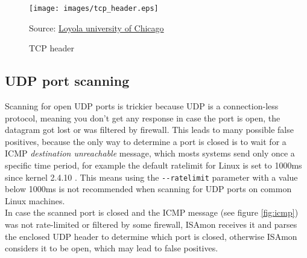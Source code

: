\documentclass[11pt,a4paper]{article}
\newcommand{\source}[1]{\caption*{Source: {#1}} }
\begin{document}
		\begin{figure}[h]
			\centering
			\texttt{[image: images/tcp\_header.eps]}
			\caption{TCP header}
			\label{fig:tcp_header}
			\source{\href{http://intronetworks.cs.luc.edu/1/html/tcp.html}{Loyola university of Chicago}}
		\end{figure}


	\subsection{UDP port scanning}
		Scanning for open UDP ports is trickier because UDP is a connection-less protocol, meaning you don't get any response in case the port is open, the datagram got lost or was filtered by firewall. This leads to many possible false positives, because the only way to determine a port is closed is to wait for a ICMP \emph{destination unreachable} message, which mosts systems send only once a specific time period, for example the default ratelimit for Linux is set to 1000ms since kernel 2.4.10 \cite{man7:icmp}. This means using the \texttt{-{}-ratelimit} parameter with a value below 1000ms is not recommended when scanning for UDP ports on common Linux machines.\\
		In case the scanned port is closed and the ICMP message (see figure \ref{fig:icmp}) was not rate-limited or filtered by some firewall, ISAmon receives it and parses the enclosed UDP header to determine which port is closed, otherwise ISAmon considers it to be open, which may lead to false positives.



\newpage

\end{document}
